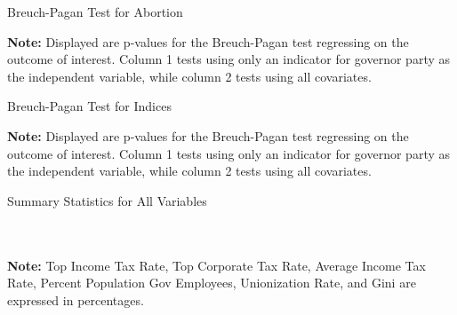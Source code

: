 \documentclass{article}
\begin{document}
\begin{table}[!hbtp]
\caption{Breuch-Pagan Test for Abortion}

\textbf{Note:} Displayed are p-values for the Breuch-Pagan test regressing on the outcome of interest. Column 1 tests using only an indicator for governor party as the independent variable, while column 2 tests using all covariates. 
\label{table:bp_abortion}
\end{table}

\begin{table}[!hbtp]
\caption{Breuch-Pagan Test for Indices}

\textbf{Note:} Displayed are p-values for the Breuch-Pagan test regressing on the outcome of interest. Column 1 tests using only an indicator for governor party as the independent variable, while column 2 tests using all covariates. 
\label{table:bp_index}
\end{table}


\begin{table}[!hbtp]
\caption{Summary Statistics for All Variables}

\\ \\
\textbf{Note:}  Top Income Tax Rate, Top Corporate Tax Rate, Average Income Tax Rate, Percent Population  Gov Employees, Unionization Rate, and Gini are expressed in percentages.
\label{table:summary_long}
\end{table}
\end{document}
